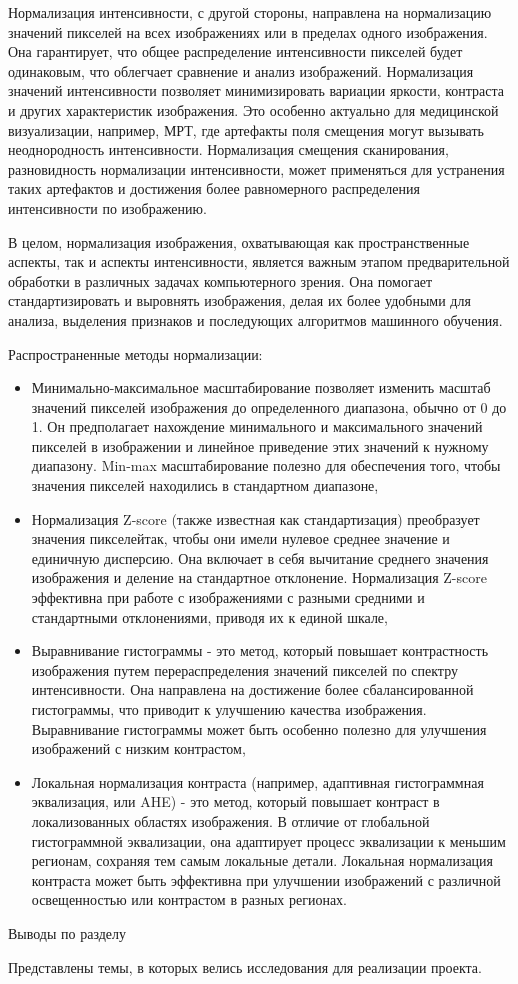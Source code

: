 Нормализация интенсивности, с другой стороны, направлена на нормализацию значений пикселей на всех изображениях или в пределах одного изображения. Она гарантирует, что общее распределение интенсивности пикселей будет одинаковым, что облегчает сравнение и анализ изображений. Нормализация значений интенсивности позволяет минимизировать вариации яркости, контраста и других характеристик изображения. Это особенно актуально для медицинской визуализации, например, МРТ, где артефакты поля смещения могут вызывать неоднородность интенсивности. Нормализация смещения сканирования, разновидность нормализации интенсивности, может применяться для устранения таких артефактов и достижения более равномерного распределения интенсивности по изображению.

В целом, нормализация изображения, охватывающая как пространственные аспекты, так и аспекты интенсивности, является важным этапом предварительной обработки в различных задачах компьютерного зрения. Она помогает стандартизировать и выровнять изображения, делая их более удобными для анализа, выделения признаков и последующих алгоритмов машинного обучения.

Распространенные методы нормализации:
\begin{itemize}
    \item Минимально-максимальное масштабирование позволяет изменить масштаб значений пикселей изображения до определенного диапазона, обычно от 0 до 1. Он предполагает нахождение минимального и максимального значений пикселей в изображении и линейное приведение этих значений к нужному диапазону. Min-max масштабирование полезно для обеспечения того, чтобы значения пикселей находились в стандартном диапазоне,
    \item Нормализация Z-score (также известная как стандартизация) преобразует значения пикселейтак, чтобы они имели нулевое среднее значение и единичную дисперсию. Она включает в себя вычитание среднего значения изображения и деление на стандартное отклонение. Нормализация Z-score эффективна при работе с изображениями с разными средними и стандартными отклонениями, приводя их к единой шкале,
    \item Выравнивание гистограммы - это метод, который повышает контрастность изображения путем перераспределения значений пикселей по спектру интенсивности. Она направлена на достижение более сбалансированной гистограммы, что приводит к улучшению качества изображения. Выравнивание гистограммы может быть особенно полезно для улучшения изображений с низким контрастом,
    \item Локальная нормализация контраста (например, адаптивная гистограммная эквализация, или AHE) - это метод, который повышает контраст в локализованных областях изображения. В отличие от глобальной гистограммной эквализации, она адаптирует процесс эквализации к меньшим регионам, сохраняя тем самым локальные детали. Локальная нормализация контраста может быть эффективна при улучшении изображений с различной освещенностью или контрастом в разных регионах.
\end{itemize}


Выводы по разделу

Представлены темы, в которых велись исследования для реализации проекта.
